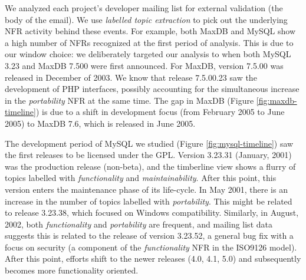 \documentclass[smallextended]{svjour3}       %
\begin{document}

We analyzed each project's developer mailing list for external validation (the body of the email).
We use \textit{labelled topic extraction} to pick out the underlying NFR activity behind these events. 
For example, both MaxDB and MySQL show a high number of NFRs recognized at the first period of analysis. 
This is due to our window choice: we deliberately targeted our
analysis to when both MySQL 3.23
and MaxDB 7.500 were first announced. For MaxDB, version 7.5.00  was released in December of 2003. 
We know that release 7.5.00.23 saw the development of PHP interfaces, possibly accounting for the simultaneous increase in the \emph{portability}
NFR at the same time.
The gap in MaxDB (Figure \ref{fig:maxdb-timeline}) is due to a shift in development focus (from February 2005 to June 2005) to MaxDB 7.6, which is
released in June 2005.

The development period of MySQL we studied  (Figure \ref{fig:mysql-timeline}) saw the first releases to be licensed under the GPL. 
Version 3.23.31 (January, 2001) was the production release (non-beta), and the timberline view shows a flurry of topics labelled with \emph{functionality} and
\emph{maintainability}. 
After this point, this version enters the maintenance phase of its life-cycle. 
In May 2001, there is an increase in the number of topics labelled with \emph{portability}. 
This might be related to release 3.23.38, which focused on Windows compatibility. 
Similarly, in August, 2002, both \emph{functionality} and \emph{portability} are frequent, and mailing list data suggests this is related to the release
of version 3.23.52, a general bug fix with a focus on security (a component of the \emph{functionality} NFR in the ISO9126 model). 
After this point, efforts shift to the newer releases (4.0, 4.1, 5.0) and subsequently becomes more functionality oriented. 
\end{document}

